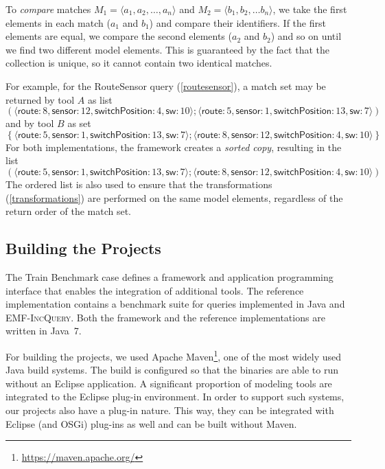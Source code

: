 \documentclass[submission,copyright,creativecommons]{eptcs}
\newcommand{\eiq}{\textsc{EMF-IncQuery}}
\begin{document}
To \emph{compare} matches $M_1 = \langle a_1, a_2, \ldots, a_n \rangle$ and $M_2 = \langle b_1, b_2, \ldots b_n \rangle$, we take the first elements in each match ($a_1$ and $b_1$) and compare their identifiers. If the first elements are equal, we compare the second elements ($a_2$ and $b_2$) and so on until we find two different model elements. This is guaranteed by the fact that the collection is unique, so it cannot contain two identical matches.

For example, for the \textsf{RouteSensor} query (\autoref{routesensor}), a match set may be returned by tool $A$ as list
\[\left(
\langle\textsf{route}: 8, \textsf{sensor}: 12, \textsf{switchPosition}: 4, \textsf{sw}: 10\rangle;
\langle\textsf{route}: 5, \textsf{sensor}: 1, \textsf{switchPosition}: 13, \textsf{sw}: 7\rangle
\right)\]
and by tool $B$ as set
\[\left\{
\langle\textsf{route}: 5, \textsf{sensor}: 1, \textsf{switchPosition}: 13, \textsf{sw}: 7\rangle;
\langle\textsf{route}: 8, \textsf{sensor}: 12, \textsf{switchPosition}: 4, \textsf{sw}: 10\rangle
\right\}\]
For both implementations, the framework creates a \emph{sorted copy}, resulting in the list
\[\left(
\langle\textsf{route}: 5, \textsf{sensor}: 1, \textsf{switchPosition}: 13, \textsf{sw}: 7\rangle;
\langle\textsf{route}: 8, \textsf{sensor}: 12, \textsf{switchPosition}: 4, \textsf{sw}: 10\rangle
\right)\]
The ordered list is also used to ensure that the transformations (\autoref{transformations}) are performed on the same model elements, regardless of the return order of the match set.

\subsection{Building the Projects}

The Train Benchmark case defines a framework and application programming interface that enables the integration of additional tools. The reference implementation contains a benchmark suite for queries implemented in Java and \eiq{}. Both the framework and the reference implementations are written in Java~7.

For building the projects, we used Apache Maven\footnote{\url{https://maven.apache.org/}}, one of the most widely used Java build systems. The build is configured so that the binaries are able to run without an Eclipse application. A significant proportion of modeling tools are integrated to the Eclipse plug-in environment. In order to support such systems, our projects also have a plug-in nature. This way, they can be integrated with Eclipse (and OSGi) plug-ins as well and can be built without Maven.
\end{document}
